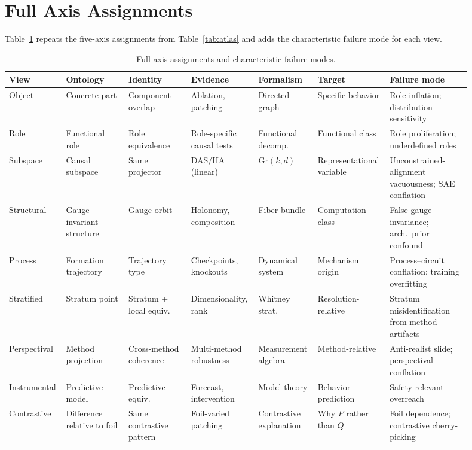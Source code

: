 \documentclass{article}
\newcommand{\Gr}{\mathrm{Gr}}
\begin{document}
\section{Full Axis Assignments}\label{app:axes}

Table~\ref{tab:full} repeats the five-axis assignments from
Table~\ref{tab:atlas} and adds the characteristic failure mode for each
view.

\begin{table}[H]
\centering
\footnotesize
\setlength{\tabcolsep}{3pt}
\begin{tabular}{p{0.09\linewidth}p{0.13\linewidth}p{0.13\linewidth}p{0.14\linewidth}p{0.12\linewidth}p{0.12\linewidth}p{0.17\linewidth}}
\toprule
\textbf{View} & \textbf{Ontology}
  & \textbf{Identity} & \textbf{Evidence}
  & \textbf{Formalism} & \textbf{Target}
  & \textbf{Failure mode} \\
\midrule
Object
  & Concrete part
  & Component overlap
  & Ablation, patching
  & Directed graph
  & Specific behavior
  & Role inflation; distribution sensitivity \\[2pt]
Role
  & Functional role
  & Role equivalence
  & Role-specific causal tests
  & Functional decomp.
  & Functional class
  & Role proliferation; underdefined roles \\[2pt]
Subspace
  & Causal subspace
  & Same projector
  & DAS/IIA (linear)
  & $\Gr(k,d)$
  & Representational variable
  & Unconstrained-alignment vacuousness; SAE conflation \\[2pt]
Structural
  & Gauge-invariant structure
  & Gauge orbit
  & Holonomy, composition
  & Fiber bundle
  & Computation class
  & False gauge invariance; arch.\ prior confound \\[2pt]
Process
  & Formation trajectory
  & Trajectory type
  & Checkpoints, knockouts
  & Dynamical system
  & Mechanism origin
  & Process--circuit conflation; training overfitting \\[2pt]
Stratified
  & Stratum point
  & Stratum + local equiv.
  & Dimensionality, rank
  & Whitney strat.
  & Resolution-relative
  & Stratum misidentification from method artifacts \\[2pt]
Perspectival
  & Method projection
  & Cross-method coherence
  & Multi-method robustness
  & Measurement algebra
  & Method-relative
  & Anti-realist slide; perspectival conflation \\[2pt]
Instrumental
  & Predictive model
  & Predictive equiv.
  & Forecast, intervention
  & Model theory
  & Behavior prediction
  & Safety-relevant overreach \\[2pt]
Contrastive
  & Difference relative to foil
  & Same contrastive pattern
  & Foil-varied patching
  & Contrastive explanation
  & Why $P$ rather than $Q$
  & Foil dependence; contrastive cherry-picking \\
\bottomrule
\end{tabular}
\caption{Full axis assignments and characteristic failure modes.}
\label{tab:full}
\end{table}
\end{document}
